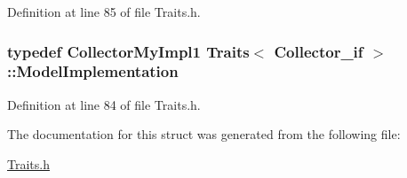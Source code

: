 Definition at line 85 of file Traits.\-h.

\hypertarget{struct_traits_3_01_collector__if_01_4_a38ef8e0ef3488a361965174720a895ae}{
\subsubsection[{Model\-Implementation}]{\setlength{\rightskip}{0pt plus 5cm}typedef {\bf Collector\-My\-Impl1} {\bf Traits}$<$ {\bf Collector\-\_\-if} $>$\-::{\bf Model\-Implementation}}}\label{struct_traits_3_01_collector__if_01_4_a38ef8e0ef3488a361965174720a895ae}


Definition at line 84 of file Traits.\-h.



The documentation for this struct was generated from the following file\-:\begin{DoxyCompactItemize}
\item 
\hyperlink{_traits_8h}{Traits.\-h}\end{DoxyCompactItemize}

